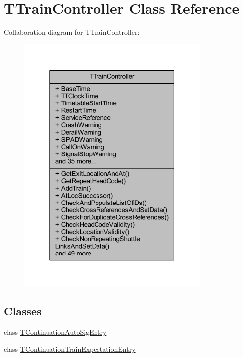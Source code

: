 \hypertarget{class_t_train_controller}{}\section{T\+Train\+Controller Class Reference}
\label{class_t_train_controller}


Collaboration diagram for T\+Train\+Controller\+:\nopagebreak
\begin{figure}[H]
\begin{center}
\leavevmode
\includegraphics[width=268pt]{class_t_train_controller__coll__graph}
\end{center}
\end{figure}
\subsection*{Classes}
\begin{DoxyCompactItemize}
\item 
class \mbox{\hyperlink{class_t_train_controller_1_1_t_continuation_auto_sig_entry}{T\+Continuation\+Auto\+Sig\+Entry}}
\item 
class \mbox{\hyperlink{class_t_train_controller_1_1_t_continuation_train_expectation_entry}{T\+Continuation\+Train\+Expectation\+Entry}}
\end{DoxyCompactItemize}
